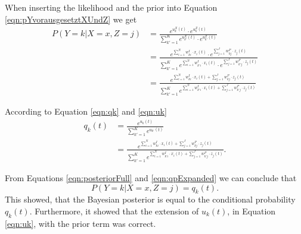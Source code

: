 When inserting the likelihood and the prior into Equation \ref{eqn:pYvorausgesetztXUndZ} we get
\begin{equation}
\label{eqn:posteriorFull}
\begin{split}
P(Y=k|X=x,Z=j) &= \frac{e^{u_k^X(t)} \cdot e^{u_k^Z(t)} }{\sum_{k'=1}^K  e^{u_{k'}^X(t)} \cdot e^{u_{k'}^Z(t)}} \\
&= \frac{e^{\sum_{i=1}^N w^{I}_{ki} \cdot x_i(t)} \cdot e^{\sum_{j=1}^J w^{P}_{kj} \cdot z_j(t)} }{\sum_{k'=1}^K  e^{\sum_{i=1}^N w^{I}_{k'i} \cdot x_i(t)} \cdot e^{\sum_{j=1}^J w^{P}_{k'j} \cdot z_j(t)}} \\
&= \frac{e^{\sum_{i=1}^N w^{I}_{ki} \cdot x_i(t) + \sum_{j=1}^J w^{P}_{kj} \cdot z_j(t) }}{\sum_{k'=1}^K  e^{\sum_{i=1}^N w^{I}_{k'i} \cdot x_i(t) + \sum_{j=1}^J w^{P}_{k'j} \cdot z_j(t)}}
\end{split}
\end{equation}

According to Equation \ref{eqn:qk} and \ref{eqn:uk}
\begin{equation}
\label{eqn:qpExpanded}
\begin{split}
q_k(t) &= \frac{e^{u_k(t)}}{\sum_{k'=1}^K e^{u_{k'}(t)}} \\
&= \frac{e^{\sum_{i=1}^N w^{I}_{ki} \cdot x_i(t) + \sum_{j=1}^J w^{P}_{kj} \cdot z_j(t)}}{\sum_{k'=1}^K e^{\sum_{i=1}^N w^{I}_{k'i} \cdot x_i(t) + \sum_{j=1}^J w^{P}_{k'j} \cdot z_j(t)}}.
\end{split}
\end{equation}

From Equations \ref{eqn:posteriorFull} and \ref{eqn:qpExpanded} we can conclude that
\begin{equation}
P(Y=k|X=x,Z=j) = q_k(t).
\end{equation}
This showed, that the Bayesian posterior is equal to the conditional probability $q_k(t)$. Furthermore, it showed that the extension of $u_k(t)$, in Equation \ref{eqn:uk}, with the prior term was correct.